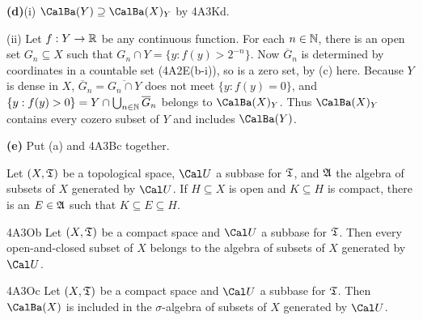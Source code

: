 {{\bf (d)}(i) $\CalBa(Y)\supseteq\CalBa(X)_Y$ by 4A3Kd.

\medskip

\quad(ii) Let $f:Y\to\Bbb R$ be any continuous function.   For each
$n\in\Bbb N$, there is an open set $G_n\subseteq X$ such that
$G_n\cap Y=\{y:f(y)>2^{-n}\}$.   Now $\overline{G}_n$ is determined by
coordinates in a countable set (4A2E(b-i)), so is a zero set,
by (c) here.   Because $Y$ is dense in $X$,
$\overline{G}_n=\overline{G_n\cap Y}$ does not meet $\{y:f(y)=0\}$, and
$\{y:f(y)>0\}=Y\cap\bigcup_{n\in\Bbb N}\overline{G}_n$ belongs to
$\CalBa(X)_Y$.   Thus $\CalBa(X)_Y$ contains every cozero subset of
$Y$ and includes $\CalBa(Y)$.

\medskip

{\bf (e)} Put (a) and 4A3Bc together.
}%

 Let $(X,\frak T)$ be a topological
space, $\Cal U$ a subbase for
$\frak T$, and $\frak A$ the algebra of subsets of $X$ generated by
$\Cal U$.   If $H\subseteq X$ is open and $K\subseteq H$ is compact,
there is an $E\in\frak A$ such that $K\subseteq E\subseteq H$.

\spheader 4A3Ob Let $(X,\frak T)$ be a compact space and $\Cal U$ a
subbase for $\frak T$.   Then every open-and-closed subset of $X$
belongs to the algebra of subsets of $X$ generated by $\Cal U$.

\spheader 4A3Oc Let $(X,\frak T)$ be a compact space and $\Cal U$ a
subbase for $\frak T$.   Then $\CalBa(X)$ is included in the
$\sigma$-algebra of subsets of $X$ generated by $\Cal U$.

